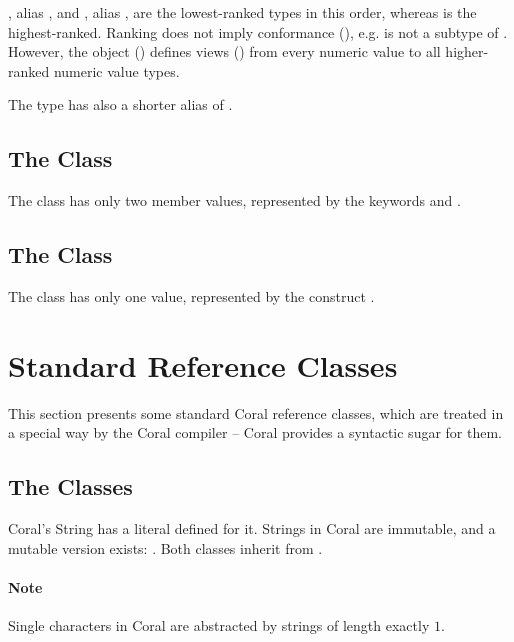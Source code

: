 , alias , and , alias , are the lowest-ranked types in this order, whereas  is the highest-ranked. Ranking does not imply conformance (), e.g.  is not a subtype of . However, the object  () defines views () from every numeric value to all higher-ranked numeric value types. 

The  type has also a shorter alias of . 





\subsection{The  Class}

The  class has only two member values, represented by the keywords  and . 





\subsection{The  Class}

The  class has only one value, represented by the construct \code{()}. 





\section{Standard Reference Classes}

This section presents some standard Coral reference classes, which are treated in a special way by the Coral compiler -- Coral provides a syntactic sugar for them. 




\subsection{The  Classes}

Coral's String has a literal defined for it. Strings in Coral are immutable, and a mutable version exists: . Both classes inherit from . 

\paragraph{Note}
Single characters in Coral are abstracted by strings of length exactly $1$. 

